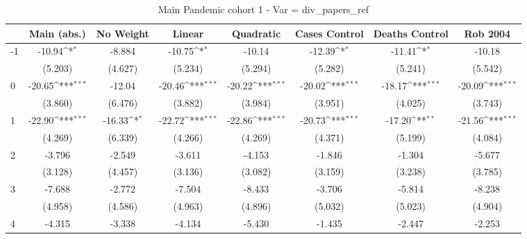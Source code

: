 \documentclass{article}
\begin{document}
{
\def\sym#1{\ifmmode^{#1}\else\(^{#1}\)\fi}
\begin{longtable}{l*{7}{c}}
\caption{Main Pandemic cohort 1 - Var = div\_papers\_ref}\\
\hline\hline\endfirsthead\hline\endhead\hline\endfoot\endlastfoot
                &\multicolumn{1}{c}{Main (abs.)}&\multicolumn{1}{c}{No Weight}&\multicolumn{1}{c}{Linear}&\multicolumn{1}{c}{Quadratic}&\multicolumn{1}{c}{Cases Control}&\multicolumn{1}{c}{Deaths Control}&\multicolumn{1}{c}{Rob 2004}\\
\hline
-1              &   -10.94\sym{*}  &   -8.884         &   -10.75\sym{*}  &   -10.14         &   -12.39\sym{*}  &   -11.41\sym{*}  &   -10.18         \\
                &  (5.203)         &  (4.627)         &  (5.234)         &  (5.294)         &  (5.282)         &  (5.241)         &  (5.542)         \\
0               &   -20.65\sym{***}&   -12.04         &   -20.46\sym{***}&   -20.22\sym{***}&   -20.02\sym{***}&   -18.17\sym{***}&   -20.09\sym{***}\\
                &  (3.860)         &  (6.476)         &  (3.882)         &  (3.984)         &  (3.951)         &  (4.025)         &  (3.743)         \\
1               &   -22.90\sym{***}&   -16.33\sym{*}  &   -22.72\sym{***}&   -22.86\sym{***}&   -20.73\sym{***}&   -17.20\sym{**} &   -21.56\sym{***}\\
                &  (4.269)         &  (6.339)         &  (4.266)         &  (4.269)         &  (4.371)         &  (5.199)         &  (4.084)         \\
2               &   -3.796         &   -2.549         &   -3.611         &   -4.153         &   -1.846         &   -1.304         &   -5.677         \\
                &  (3.128)         &  (4.457)         &  (3.136)         &  (3.082)         &  (3.159)         &  (3.238)         &  (3.785)         \\
3               &   -7.688         &   -2.772         &   -7.504         &   -8.433         &   -3.706         &   -5.814         &   -8.238         \\
                &  (4.958)         &  (4.586)         &  (4.963)         &  (4.896)         &  (5.032)         &  (5.023)         &  (4.904)         \\
4               &   -4.315         &   -3.338         &   -4.134         &   -5.430         &   -1.435         &   -2.447         &   -2.253         \\

\end{longtable}}
\end{document}
